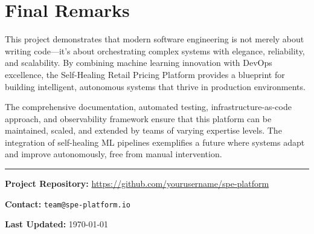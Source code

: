 \documentclass[12pt,a4paper]{report}
\begin{document}
\section{Final Remarks}

This project demonstrates that modern software engineering is not merely about writing code---it's about orchestrating complex systems with elegance, reliability, and scalability. By combining machine learning innovation with DevOps excellence, the Self-Healing Retail Pricing Platform provides a blueprint for building intelligent, autonomous systems that thrive in production environments.

The comprehensive documentation, automated testing, infrastructure-as-code approach, and observability framework ensure that this platform can be maintained, scaled, and extended by teams of varying expertise levels. The integration of self-healing ML pipelines exemplifies a future where systems adapt and improve autonomously, free from manual intervention.

\vspace{2em}
\hrule
\vspace{1em}

\noindent\textbf{Project Repository:} \url{https://github.com/yourusername/spe-platform}

\noindent\textbf{Contact:} \texttt{team@spe-platform.io}

\noindent\textbf{Last Updated:} \today
\end{document}
